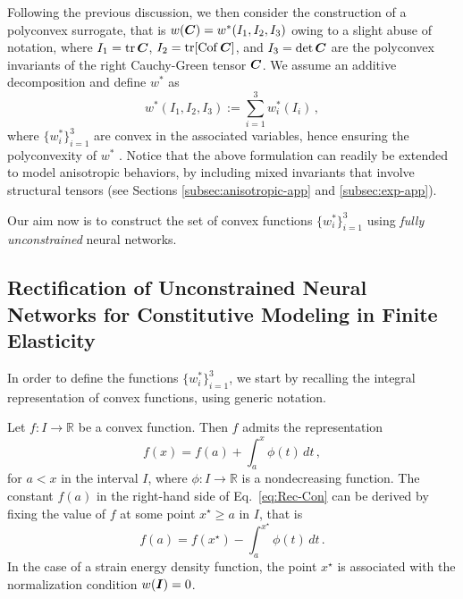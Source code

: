 Following the previous discussion, we then consider the construction of a polyconvex surrogate, that is $w(\boldsymbol{C}) = w^*(I_1, I_2, I_3)$
owing to a slight abuse of notation, where $I_1 = \operatorname{tr} \boldsymbol{C}$, $I_2 = \operatorname{tr} [ \mathrm{Cof}\,\boldsymbol{C} ]$, and $I_3 = \det \boldsymbol{C}$ are the polyconvex invariants of the right Cauchy-Green tensor $\boldsymbol{C}$. We assume an additive decomposition and define $w^*$ as
\begin{equation}
    w^*(I_1, I_2, I_3) := \sum_{i = 1}^{3} w_i^*(I_i)\,,
\end{equation}
where $\{w_i^*\}_{i = 1}^3$ are convex in the associated variables, hence ensuring the polyconvexity of $w^*$ \cite{hartmann2003polyconvexity,schroder2003invariant}. Notice that the above formulation can readily be extended to model anisotropic behaviors, by including mixed invariants that involve structural tensors \cite{ebbing2010construction} (see Sections \ref{subsec:anisotropic-app} and \ref{subsec:exp-app}). 

Our aim now is to construct the set of convex functions $\{w_i^*\}_{i = 1}^3$ using \textit{fully unconstrained} neural networks. %

\subsection{Rectification of Unconstrained Neural Networks for Constitutive Modeling in Finite Elasticity}
\label{subsec:rectification}
In order to define the functions $\{w_i^*\}_{i = 1}^3$, we start by recalling the integral representation of convex functions, using generic notation. 

Let $f:I \to \mathbb{R}$ be a convex function. Then $f$ admits the representation
\begin{equation}\label{eq:Rec-Con}
    f(x) = f(a) + \int_a^x \phi(t)\,dt\,,
\end{equation}
for $a < x$ in the interval $I$, where $\phi:I \to \mathbb{R}$ is a nondecreasing function. The constant $f(a)$ in the right-hand side of Eq.~\eqref{eq:Rec-Con} can be derived by fixing the value of $f$ at some point $x^\star \geq a$ in $I$, that is
\begin{equation}\label{eq:Rec-Con-Value}
    f(a) = f(x^\star) - \int_a^{x^\star} \phi(t)\,dt\,.
\end{equation}
In the case of a strain energy density function, the point $x^\star$ is associated with the normalization condition $w(\boldsymbol{I}) = 0$.

